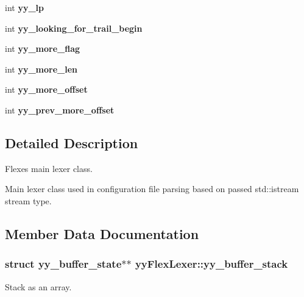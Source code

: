 \begin{DoxyCompactItemize}
\item 
int {\bfseries yy\+\_\+lp}\hypertarget{classyyFlexLexer_a871eaaa926a2a9f30bd32b74b66086de}{}\label{classyyFlexLexer_a871eaaa926a2a9f30bd32b74b66086de}

\item 
int {\bfseries yy\+\_\+looking\+\_\+for\+\_\+trail\+\_\+begin}\hypertarget{classyyFlexLexer_abd1ffa5da6e43ba3c793b47afed9a021}{}\label{classyyFlexLexer_abd1ffa5da6e43ba3c793b47afed9a021}

\item 
int {\bfseries yy\+\_\+more\+\_\+flag}\hypertarget{classyyFlexLexer_a4307cac1084ef13216ac81f053612328}{}\label{classyyFlexLexer_a4307cac1084ef13216ac81f053612328}

\item 
int {\bfseries yy\+\_\+more\+\_\+len}\hypertarget{classyyFlexLexer_a4e2974edc8f7f6f12e0bd804c8e71c59}{}\label{classyyFlexLexer_a4e2974edc8f7f6f12e0bd804c8e71c59}

\item 
int {\bfseries yy\+\_\+more\+\_\+offset}\hypertarget{classyyFlexLexer_ae29ac547c7898e6b3ed19cda622e95e7}{}\label{classyyFlexLexer_ae29ac547c7898e6b3ed19cda622e95e7}

\item 
int {\bfseries yy\+\_\+prev\+\_\+more\+\_\+offset}\hypertarget{classyyFlexLexer_afcb935f8692299f97a78fb77b1e67ed0}{}\label{classyyFlexLexer_afcb935f8692299f97a78fb77b1e67ed0}

\end{DoxyCompactItemize}


\subsection{Detailed Description}
Flex\textquotesingle{}es main lexer class. 

Main lexer class used in configuration file parsing based on passed std\+::istream stream type. 

\subsection{Member Data Documentation}
\subsubsection[{\texorpdfstring{yy\+\_\+buffer\+\_\+stack}{yy_buffer_stack}}]{\setlength{\rightskip}{0pt plus 5cm}struct {\bf yy\+\_\+buffer\+\_\+state}$\ast$$\ast$ yy\+Flex\+Lexer\+::yy\+\_\+buffer\+\_\+stack\hspace{0.3cm}{\ttfamily [protected]}}\hypertarget{classyyFlexLexer_ae4914f003bda6f0dfc20e30703673bea}{}\label{classyyFlexLexer_ae4914f003bda6f0dfc20e30703673bea}
Stack as an array. 
